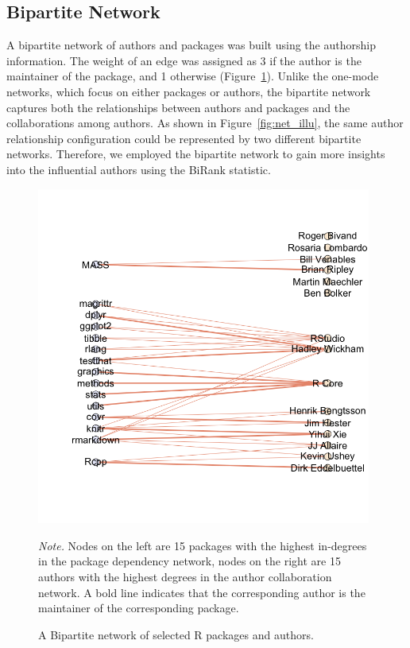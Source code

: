 \subsection{Bipartite Network}

A bipartite network of authors and packages was built using the authorship information. The weight of an edge was assigned as 3 if the author is the maintainer of the package, and 1 otherwise (Figure~\ref{fig:bipar}). Unlike the one-mode networks, which focus on either packages or authors, the bipartite network captures both the relationships between authors and packages and the collaborations among authors. As shown in Figure~\ref{fig:net_illu}, the same author relationship configuration could be represented by two different bipartite networks. Therefore, we employed the bipartite network to gain more insights into the influential authors using the BiRank statistic.

\begin{figure}[h]
    \begin{center}   
    \includegraphics[width=11cm,trim=50 70 0 50,clip]{fig/plot_bipar.png}
    \caption{A Bipartite network of selected R packages and authors.} \label{fig:bipar}
    \end{center}
   {\small
\textit{Note.} Nodes on the left are 15 packages with the highest in-degrees in the package dependency network, nodes on the right are 15 authors with the highest degrees in the author collaboration network. A bold line indicates that the corresponding author is the maintainer of the corresponding package.
}


\end{figure}



